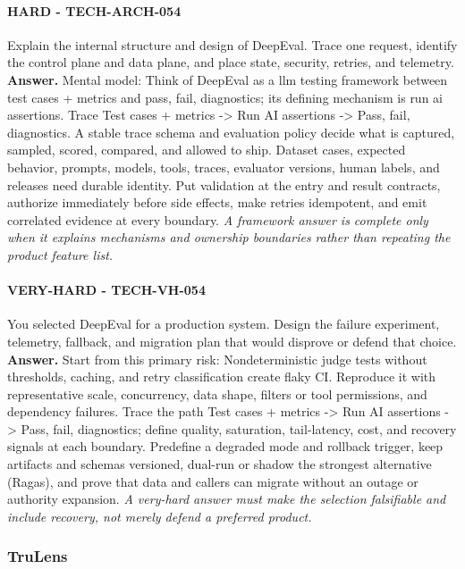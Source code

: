 \paragraph{HARD - TECH-ARCH-054} Explain the internal structure and design of DeepEval. Trace one request, identify the control plane and data plane, and place state, security, retries, and telemetry.
\textbf{Answer.} Mental model: Think of DeepEval as a llm testing framework between test cases + metrics and pass, fail, diagnostics; its defining mechanism is run ai assertions. Trace Test cases + metrics -> Run AI assertions -> Pass, fail, diagnostics. A stable trace schema and evaluation policy decide what is captured, sampled, scored, compared, and allowed to ship. Dataset cases, expected behavior, prompts, models, tools, traces, evaluator versions, human labels, and releases need durable identity. Put validation at the entry and result contracts, authorize immediately before side effects, make retries idempotent, and emit correlated evidence at every boundary.
\textit{A framework answer is complete only when it explains mechanisms and ownership boundaries rather than repeating the product feature list.}
\paragraph{VERY-HARD - TECH-VH-054} You selected DeepEval for a production system. Design the failure experiment, telemetry, fallback, and migration plan that would disprove or defend that choice.
\textbf{Answer.} Start from this primary risk: Nondeterministic judge tests without thresholds, caching, and retry classification create flaky CI. Reproduce it with representative scale, concurrency, data shape, filters or tool permissions, and dependency failures. Trace the path Test cases + metrics -> Run AI assertions -> Pass, fail, diagnostics; define quality, saturation, tail-latency, cost, and recovery signals at each boundary. Predefine a degraded mode and rollback trigger, keep artifacts and schemas versioned, dual-run or shadow the strongest alternative (Ragas), and prove that data and callers can migrate without an outage or authority expansion.
\textit{A very-hard answer must make the selection falsifiable and include recovery, not merely defend a preferred product.}
\subsubsection*{TruLens}
